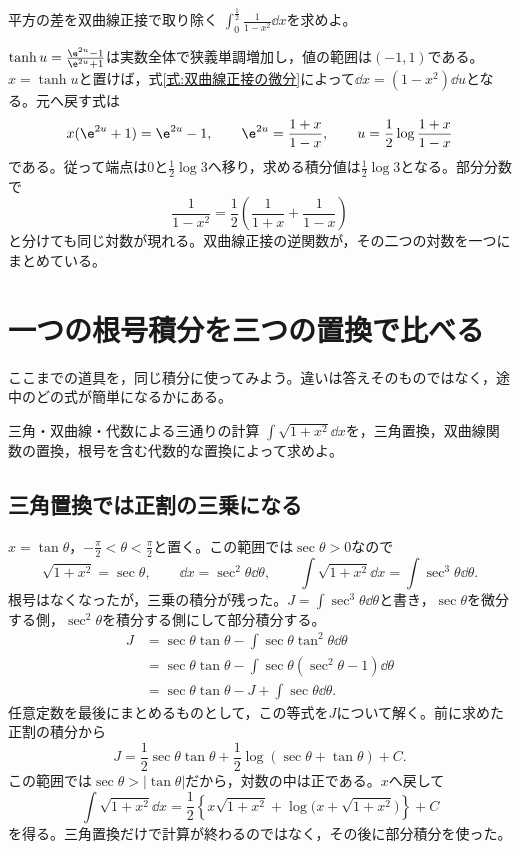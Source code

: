 \begin{example}{平方の差を双曲線正接で取り除く}
$\int_0^{\frac12}\frac1{1-x^2}\dd x$を求めよ。
\end{example}

$\tanh u=\frac{\e^{2u}-1}{\e^{2u}+1}$は実数全体で狭義単調増加し，値の範囲は$(-1,1)$である。$x=\tanh u$と置けば，式\eqref{式:双曲線正接の微分}によって$\dd x=(1-x^2)\dd u$となる。元へ戻す式は
\[
x(\e^{2u}+1)=\e^{2u}-1,\qquad
\e^{2u}=\frac{1+x}{1-x},\qquad
u=\frac12\log\frac{1+x}{1-x}
\]
である。従って端点は$0$と$\frac12\log3$へ移り，求める積分値は$\frac12\log3$となる。部分分数で
\[
\frac1{1-x^2}=\frac12\left(\frac1{1+x}+\frac1{1-x}\right)
\]
と分けても同じ対数が現れる。双曲線正接の逆関数が，その二つの対数を一つにまとめている。

\section{一つの根号積分を三つの置換で比べる}\label{節:根号積分の三方法}

ここまでの道具を，同じ積分に使ってみよう。違いは答えそのものではなく，途中のどの式が簡単になるかにある。

\begin{example}{三角・双曲線・代数による三通りの計算}
$\int\sqrt{1+x^2}\dd x$を，三角置換，双曲線関数の置換，根号を含む代数的な置換によって求めよ。
\end{example}

\subsection{三角置換では正割の三乗になる}

$x=\tan\theta$，$-\frac\pi2<\theta<\frac\pi2$と置く。この範囲では$\sec\theta>0$なので
\[
\sqrt{1+x^2}=\sec\theta,\qquad
\dd x=\sec^2\theta\dd\theta,\qquad
\int\sqrt{1+x^2}\dd x=\int\sec^3\theta\dd\theta.
\]
根号はなくなったが，三乗の積分が残った。$J=\int\sec^3\theta\dd\theta$と書き，$\sec\theta$を微分する側，$\sec^2\theta$を積分する側にして部分積分する。
\[
\begin{aligned}
J&=\sec\theta\tan\theta
-\int\sec\theta\tan^2\theta\dd\theta\\
&=\sec\theta\tan\theta
-\int\sec\theta(\sec^2\theta-1)\dd\theta\\
&=\sec\theta\tan\theta-J+\int\sec\theta\dd\theta.
\end{aligned}
\]
任意定数を最後にまとめるものとして，この等式を$J$について解く。前に求めた正割の積分から
\[
J=\frac12\sec\theta\tan\theta
+\frac12\log(\sec\theta+\tan\theta)+C.
\]
この範囲では$\sec\theta>|\tan\theta|$だから，対数の中は正である。$x$へ戻して
\begin{equation}\label{式:一と二乗の根号積分}
\int\sqrt{1+x^2}\dd x
=\frac12\left\{x\sqrt{1+x^2}
+\log\bigl(x+\sqrt{1+x^2}\bigr)\right\}+C
\end{equation}
を得る。三角置換だけで計算が終わるのではなく，その後に部分積分を使った。

